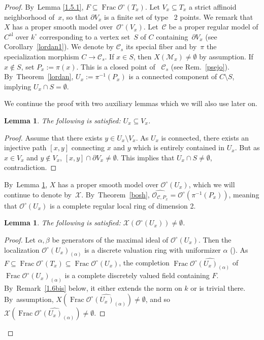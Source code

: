 \documentclass[JEP,XML,SOM,Unicode,NoFloatCountersInSection,published]{cedram}
\newcommand{\al}{\mathrm{al}}
\DeclareMathOperator{\Frac}{Frac}
\let\backslash\setminus
\newtheorem{lm}[thm]{Lemma}
\theoremstyle{definition}
\begin{document}
\begin{proof} By~Lemma \ref{1.5.1}, $F \subseteq \Frac \mathcal{O}^{\circ}(T_x)$. Let $V_x \subseteq T_x$ a strict affinoid neighborhood of~$x$, so that $\partial{V_x}$ is a finite set of type ~2 points. We remark that $X$ has a proper smooth model over~$\mathcal{O}^{\circ}(V_x)$.
Let~$\mathscr{C}$ be a proper regular model of $C^{\al}$ over $k^{\circ}$ corresponding to a vertex set~$S$ of $C$ containing~$\partial{V_x}$ (see Corollary~\ref{lordan1}). We denote by $\mathscr{C}_s$ its special fiber and by~$\pi$ the specialization morphism $C \to \mathscr{C}_s$. If $x \in S$, then $X(\mathscr{M}_x) \neq \emptyset$ by assumption. If $x \not \in S$, set $P_x:=\pi(x)$. This is a closed point of ~$\mathscr{C}_s$ (see Rem.~\ref{psejo}). By~Theo\-rem~\ref{lordan}, $U_x:=\pi^{-1}(P_x)$ is a connected component of $C \backslash S$, implying \hbox{$U_x \cap S =\emptyset$}.

We continue the proof with two auxiliary lemmas which we will also use later on.

\begin{lm} \label{ekstra}
The following is satisfied: $U_x \subseteq V_x$.
\end{lm}

\begin{proof}
Assume that there exists $y \in U_x \backslash V_x$. As $U_x$ is connected, there exists an injective path $[x,y]$ connecting $x$ and $y$ which is entirely contained in $U_x$. But as $x \in V_x$ and $y \not \in V_x$, $[x,y] \cap \partial{V_x} \neq \emptyset$. This implies that $U_x \cap S \neq \emptyset$, contradiction.
\end{proof}

By~Lemma \ref{ekstra}, $X$ has a proper smooth model over $\mathcal{O}^{\circ}(U_x)$, which we will continue to denote by~$\mathcal{X}$. By~Theorem~\ref{bosh}, $\widehat{\mathcal{O}_{\mathscr{C}, P_x}}=\mathcal{O}^{\circ}(\pi^{-1}(P_x))$, meaning that $\mathcal{O}^{\circ}(U_x)$ is a complete regular local ring of dimension 2.

\begin{lm} \label{1.5.2}
The following is satisfied: $\mathcal{X}(\mathcal{O}^{\circ}(U_x)) \neq \emptyset$.
\end{lm}

\begin{proof} Let $\alpha, \beta$ be generators of the maximal ideal of $\mathcal{O}^{\circ}(U_x)$. Then the localization $\mathcal{O}^{\circ}(U_x)_{(\alpha)}$ is a discrete valuation ring with uniformizer $\alpha$ (\cite[Tag\,0AFS]{stacks}). As~$F \subseteq \Frac \mathcal{O}^{\circ}(T_x) \subseteq \Frac \mathcal{O}^{\circ}(U_x)$, the completion $\Frac \widehat{\mathcal{O}^{\circ}(U_x)_{(\alpha)}}$ of $\Frac \mathcal{O}^{\circ}(U_x)_{(\alpha)}$ is a complete discretely valued field containing $F$. By~Remark~\ref{1.6bis} below, it either extends the norm on $k$ or is trivial there. By~assumption, $X(\Frac \widehat{\mathcal{O}^{\circ}(U_x)_{(\alpha)}}) \neq \emptyset$, and so $\mathcal{X}(\Frac \widehat{\mathcal{O}^{\circ}(U_x)_{(\alpha)}}) \neq \emptyset$.


\end{proof}
\end{proof}
\end{document}
